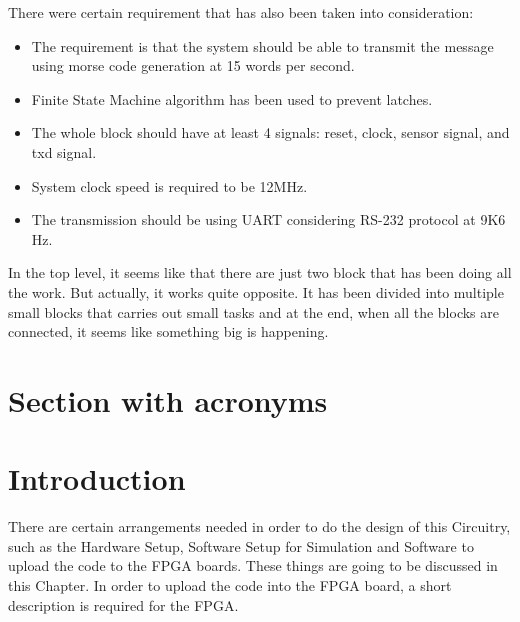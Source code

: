 \documentclass[12pt,a4paper]{article}
\begin{document}
There were certain requirement that has also been taken into consideration:
\begin{itemize}
\item The requirement is that the system should be able to transmit the message using morse code generation at 15 words per second.\

\item Finite State Machine algorithm has been used to prevent latches.

\item The whole block should have at least 4 signals: reset, clock, sensor signal, and txd signal.\

\item System clock speed is required to be 12MHz. \

\item The transmission should be using UART considering RS-232 protocol at 9K6 Hz.\
\end{itemize}

In the top level, it seems like that there are just two block that has been doing all the work. But actually, it works quite opposite. It has been divided into multiple small blocks that carries out small tasks and at the end, when all the blocks are connected, it seems like something big is happening. \\




\newpage
\pagestyle{fancy}
\fancyfoot{}
\fancyhead{}
\setlength{\footskip=25pt}
\setlength{\headheight=0pt}

\fancyfoot{}
\newpage

\setcounter{page}{5}
\tableofcontents
\clearpage

\section*{Section with acronyms}



\printglossary[type=\acronymtype]


\listoffigures
\clearpage


\fancyfoot{}
\rfoot{\thepage}
\setcounter{page}{1}
\renewcommand{\baselinestretch}{1.5} %
\section{Introduction}
There are certain arrangements needed in order to do the design of this Circuitry, such as the Hardware Setup, Software Setup for Simulation and Software to upload the code to the FPGA boards. These things are going to be discussed in this Chapter. In order to upload the code into the FPGA board, a short description is required for the FPGA.\
\end{document}
